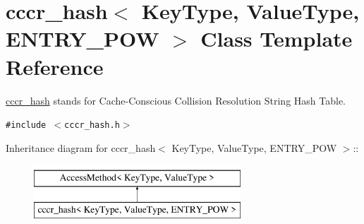 \hypertarget{classcccr__hash}{
\section{cccr\_\-hash$<$ KeyType, ValueType, ENTRY\_\-POW $>$ Class Template Reference}
\label{classcccr__hash}
}
\hyperlink{classcccr__hash}{cccr\_\-hash} stands for Cache-Conscious Collision Resolution String Hash Table.  


{\tt \#include $<$cccr\_\-hash.h$>$}

Inheritance diagram for cccr\_\-hash$<$ KeyType, ValueType, ENTRY\_\-POW $>$::\begin{figure}[H]
\begin{center}
\leavevmode
\includegraphics[height=2cm]{classcccr__hash}
\end{center}
\end{figure}
